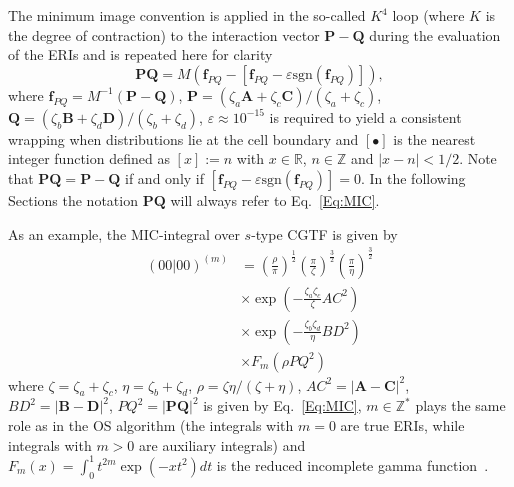 \documentclass[prl,twocolumn,showpacs,twocolumngrid,superbib]{revtex4}
\begin{document}
The minimum image convention is applied in the so-called $K^4$ loop 
(where $K$ is the degree of contraction)
to the interaction vector $\mathbf{P-Q}$ during the evaluation of the ERIs and is 
repeated here for clarity 
\begin{equation}\label{Eq:MIC}
  \mathbf{PQ}=M(\mathbf{f}_{PQ}-[\mathbf{f}_{PQ}-\varepsilon \mathrm{sgn}(\mathbf{f}_{PQ})]),
\end{equation}
where $\mathbf{f}_{PQ}=M^{-1}(\mathbf{P-Q})$, 
$\mathbf{P}=(\zeta_a\mathbf{A}+\zeta_c\mathbf{C})/(\zeta_a+\zeta_c)$, 
$\mathbf{Q}=(\zeta_b\mathbf{B}+\zeta_d\mathbf{D})/(\zeta_b+\zeta_d)$, 
$\varepsilon\approx 10^{-15}$ is 
required to yield a consistent wrapping when distributions lie at the cell boundary 
and $[\bullet]$ is the nearest integer function defined as 
$[x]:=n$ with $x\in \mathbb{R}$, $n\in \mathbb{Z}$ and $|x-n|<1/2$.
Note that $\mathbf{PQ}=\mathbf{P-Q}$ if and only if $[\mathbf{f}_{PQ}-\varepsilon\mathrm{sgn}(\mathbf{f}_{PQ})]=0$.
In the following Sections the notation $\mathbf{PQ}$ will always refer to Eq.~\ref{Eq:MIC}.

As an example, the MIC-integral over $s$-type CGTF is given by
\begin{equation}
  \begin{split}
  (00|00)^{(m)}&=\left(\frac{\rho}{\pi}\right)^{\frac{1}{2}}
    \left(\frac{\pi}{\zeta}\right)^{\frac{3}{2}}\left(\frac{\pi}{\eta}\right)^{\frac{3}{2}}\\
    &\times\exp\left(-\frac{\zeta_a\zeta_c}{\zeta}AC^2\right) \\
    &\times\exp\left(-\frac{\zeta_b\zeta_d}{\eta}BD^2\right) \\
    &\times F_{m}(\rho PQ^2)
  \end{split}
\end{equation}
where $\zeta=\zeta_a+\zeta_c$, $\eta=\zeta_b+\zeta_d$, $\rho=\zeta\eta/(\zeta+\eta)$,
$AC^2=|\mathbf{A-C}|^2$, $BD^2=|\mathbf{B-D}|^2$, $PQ^2=|\mathbf{PQ}|^2$ 
is given by Eq.~\ref{Eq:MIC}, $m\in\mathbb{Z}^*$ plays %
the same role as in the OS algorithm (the integrals with $m=0$ are true ERIs, while
integrals with $m>0$ are auxiliary integrals)
and $F_m(x)=\int_0^1t^{2m}\exp(-xt^2)dt$ is the reduced incomplete gamma function~\cite{IShavitt63}.
\end{document}
